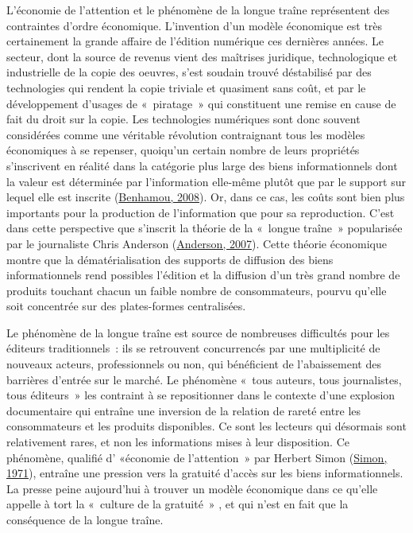 \documentclass[12pt,french,letterpaper,]{article}
\begin{document}
L'économie de l'attention et le phénomène de la longue traîne
représentent des contraintes d'ordre économique. L'invention d'un modèle
économique est très certainement la grande affaire de l'édition
numérique ces dernières années. Le secteur, dont la source de revenus
vient des maîtrises juridique, technologique et industrielle de la copie
des oeuvres, s'est soudain trouvé déstabilisé par des technologies qui
rendent la copie triviale et quasiment sans coût, et par le
développement d'usages de «~piratage~» qui constituent une remise en
cause de fait du droit sur la copie. Les technologies numériques sont
donc souvent considérées comme une véritable révolution contraignant
tous les modèles économiques à se repenser, quoiqu'un certain nombre de
leurs propriétés s'inscrivent en réalité dans la catégorie plus large
des biens informationnels dont la valeur est déterminée par
l'information elle-même plutôt que par le support sur lequel elle est
inscrite (\protect\hyperlink{ref-benhamou_leconomie_2008}{Benhamou,
2008}). Or, dans ce cas, les coûts sont bien plus importants pour la
production de l'information que pour sa reproduction. C'est dans cette
perspective que s'inscrit la théorie de la «~longue traîne~» popularisée
par le journaliste Chris Anderson
(\protect\hyperlink{ref-anderson_long_2007}{Anderson, 2007}). Cette
théorie économique montre que la dématérialisation des supports de
diffusion des biens informationnels rend possibles l'édition et la
diffusion d'un très grand nombre de produits touchant chacun un faible
nombre de consommateurs, pourvu qu'elle soit concentrée sur des
plates-formes centralisées.

Le phénomène de la longue traîne est source de nombreuses difficultés
pour les éditeurs traditionnels~: ils se retrouvent concurrencés par une
multiplicité de nouveaux acteurs, professionnels ou non, qui bénéficient
de l'abaissement des barrières d'entrée sur le marché. Le phénomène
«~tous auteurs, tous journalistes, tous éditeurs~» les contraint à se
repositionner dans le contexte d'une explosion documentaire qui entraîne
une inversion de la relation de rareté entre les consommateurs et les
produits disponibles. Ce sont les lecteurs qui désormais sont
relativement rares, et non les informations mises à leur disposition. Ce
phénomène, qualifié d' «économie de l'attention~» par Herbert Simon
(\protect\hyperlink{ref-simon_designing_1971}{Simon, 1971}), entraîne
une pression vers la gratuité d'accès sur les biens informationnels. La
presse peine aujourd'hui à trouver un modèle économique dans ce qu'elle
appelle à tort la «~culture de la gratuité~» , et qui n'est en fait que
la conséquence de la longue traîne.
\end{document}
